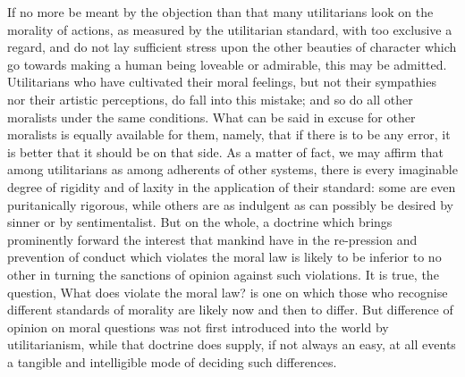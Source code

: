 If no more be meant by the objection than that many utilitarians look
on the morality of actions, as measured by the utilitarian standard,
with too exclusive a regard, and do not lay sufficient stress upon the
other beauties of character which go towards making a human being
loveable or admirable, this may be admitted. Utilitarians who have
cultivated their moral feelings, but not their sympathies nor their
artistic perceptions, do fall into this mistake; and so do all other
moralists under the same conditions. What can be said in excuse for
other moralists is equally available for them, namely, that if there
is to be any error, it is better that it should be on that side. As a
matter of fact, we may affirm that among utilitarians as among
adherents of other systems, there is every imaginable degree of
rigidity and of laxity in the application of their standard: some are
even puritanically rigorous, while others are as indulgent as can
possibly be desired by sinner or by sentimentalist. But on the whole,
a doctrine which brings prominently forward the interest that mankind
have in the re-pression and prevention of conduct which
violates the moral law is likely to be inferior to no other in turning
the sanctions of opinion against such violations. It is true, the
question, What does violate the moral law? is one on which those who
recognise different standards of morality are likely now and then to
differ. But difference of opinion on moral questions was not first
introduced into the world by utilitarianism, while that doctrine does
supply, if not always an easy, at all events a tangible and
intelligible mode of deciding such differences.

\vspace{1\baselineskip}

